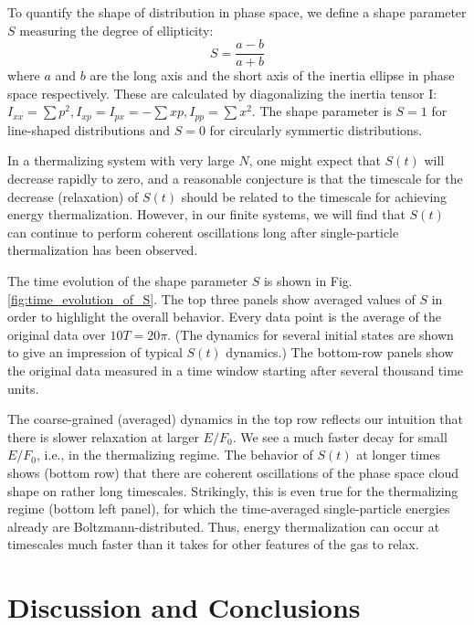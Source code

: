 \documentclass[a4paper, onecolumn]{revtex4-1}
\begin{document}
To quantify the shape of distribution in phase space, we define a shape parameter $S$ measuring the
degree of ellipticity:
\begin{equation}
S=\frac{a-b}{a+b}
\end{equation}
where $a$ and $b$ are the long axis and the short axis of the inertia ellipse in phase space
respectively.  These are calculated by diagonalizing the inertia tensor I: $I_{xx}=\sum{p^2},
I_{xp}=I_{px}=-\sum{xp},I_{pp}=\sum{x^2}$.  The shape parameter is $S=1$ for line-shaped
distributions and $S=0$ for circularly symmertic distributions.  

In a thermalizing system with very large $N$, one might expect that $S(t)$ will decrease rapidly to
zero, and a reasonable conjecture is that the timescale for the decrease (relaxation) of $S(t)$
should be related to the timescale for achieving energy thermalization.  However, in our finite
systems, we will find that $S(t)$ can continue to perform coherent oscillations long after
single-particle thermalization has been observed.


The time evolution of the shape parameter $S$ is shown in Fig.\ref{fig:time_evolution_of_S}.
%
The top three panels show averaged values of $S$ in order to highlight the overall behavior.  Every
data point is the average of the original data over $10T = 20\pi$.  (The dynamics for several
initial states are shown to give an impression of typical $S(t)$ dynamics.)  The bottom-row panels
show the original data measured in a time window starting after several thousand time units.

The coarse-grained (averaged) dynamics in the top row reflects our intuition that there is slower
relaxation at larger $E/F_0$.  We see a much faster decay for small $E/F_0$, i.e., in the
thermalizing regime.
%
The behavior of $S(t)$ at longer times shows (bottom row) that there are coherent oscillations of
the phase space cloud shape on rather long timescales.  Strikingly, this is even true for the
thermalizing regime (bottom left panel), for which the time-averaged single-particle energies
already are Boltzmann-distributed.  Thus, energy thermalization can occur at timescales much faster
than it takes for other features of the gas to relax.




\section{Discussion and Conclusions} \label{sec:concl} 
\end{document}
